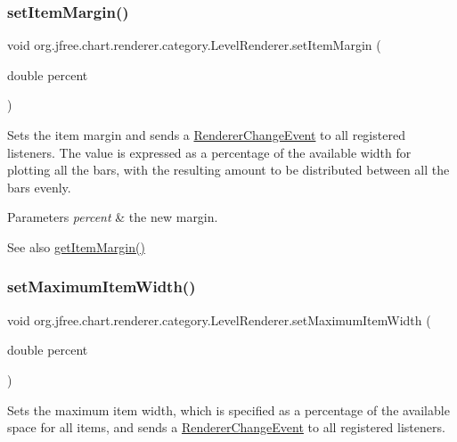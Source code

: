 \subsubsection{\texorpdfstring{set\+Item\+Margin()}{setItemMargin()}}
{\footnotesize\ttfamily void org.\+jfree.\+chart.\+renderer.\+category.\+Level\+Renderer.\+set\+Item\+Margin (\begin{DoxyParamCaption}\item[{double}]{percent }\end{DoxyParamCaption})}

Sets the item margin and sends a \mbox{\hyperlink{}{Renderer\+Change\+Event}} to all registered listeners. The value is expressed as a percentage of the available width for plotting all the bars, with the resulting amount to be distributed between all the bars evenly.


\begin{DoxyParams}{Parameters}
{\em percent} & the new margin.\\
\hline
\end{DoxyParams}
\begin{DoxySeeAlso}{See also}
\mbox{\hyperlink{classorg_1_1jfree_1_1chart_1_1renderer_1_1category_1_1_level_renderer_aa3b02fa6e0fc56b868993773e8db90db}{get\+Item\+Margin()}} 
\end{DoxySeeAlso}
\mbox{\label{classorg_1_1jfree_1_1chart_1_1renderer_1_1category_1_1_level_renderer_ab661cdb9984c132949d5229d1f581bb4}} 
\subsubsection{\texorpdfstring{set\+Maximum\+Item\+Width()}{setMaximumItemWidth()}}
{\footnotesize\ttfamily void org.\+jfree.\+chart.\+renderer.\+category.\+Level\+Renderer.\+set\+Maximum\+Item\+Width (\begin{DoxyParamCaption}\item[{double}]{percent }\end{DoxyParamCaption})}

Sets the maximum item width, which is specified as a percentage of the available space for all items, and sends a \mbox{\hyperlink{}{Renderer\+Change\+Event}} to all registered listeners.


